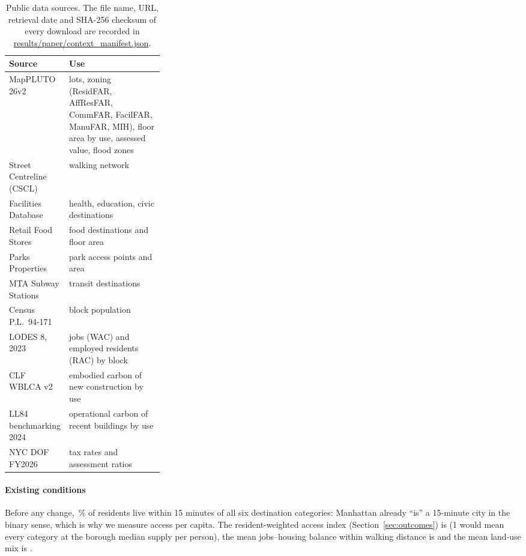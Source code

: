 \documentclass[preprint,12pt]{elsarticle}
\begin{document}
\begin{table}[t]
\centering\small
\caption{Public data sources. The file name, URL, retrieval date and SHA-256 checksum of every download are recorded in \url{results/paper/context_manifest.json}.}
\label{tab:sources}
\begin{tabularx}{\linewidth}{>{\raggedright\arraybackslash}p{0.3\linewidth}>{\raggedright\arraybackslash}X}
\toprule
Source & Use \\
\midrule
MapPLUTO 26v2 \cite{dcp_mappluto} & lots, zoning (ResidFAR, AffResFAR, CommFAR, FacilFAR, ManuFAR, MIH), floor area by use, assessed value, flood zones \\
Street Centreline (CSCL) \cite{nyc_cscl} & walking network \\
Facilities Database \cite{nyc_facdb} & health, education, civic destinations \\
Retail Food Stores \cite{nys_food} & food destinations and floor area \\
Parks Properties \cite{nyc_parks} & park access points and area \\
MTA Subway Stations \cite{mta_stations} & transit destinations \\
2020 Census P.L.\ 94-171 \cite{census2020pl} & block population \\
LODES 8, 2023 \cite{lodes8} & jobs (WAC) and employed residents (RAC) by block \\
CLF WBLCA v2 \cite{benke2025harmonized,clf_wblca_data} & embodied carbon of new construction by use \\
LL84 benchmarking 2024 \cite{nyc_ll84} & operational carbon of recent buildings by use \\
NYC DOF FY2026 \cite{nyc_dof2026} & tax rates and assessment ratios \\
\bottomrule
\end{tabularx}
\end{table}

\paragraph{Existing conditions} Before any change, \BaseFullPct{}\,\% of residents live within 15 minutes of all six destination categories: Manhattan already ``is'' a 15-minute city in the binary sense, which is why we measure access per capita. The resident-weighted access index (Section~\ref{sec:outcomes}) is \BaseAccess{} (1 would mean every category at the borough median supply per person), the mean jobs--housing balance within walking distance is \BaseJH{} and the mean land-use mix is \BaseMix{}.
\end{document}
